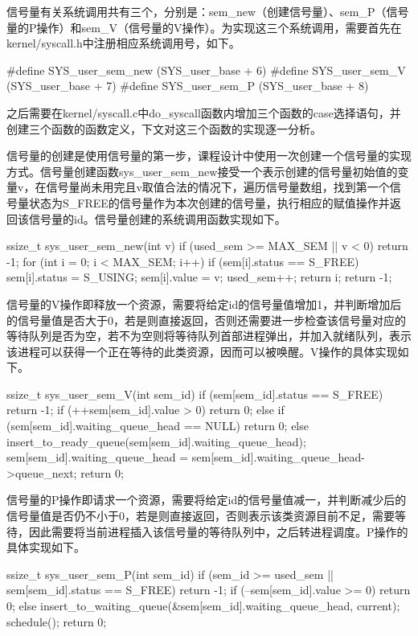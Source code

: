信号量有关系统调用共有三个，分别是：sem_new（创建信号量）、sem_P（信号量的P操作）和sem_V（信号量的V操作）。为实现这三个系统调用，需要首先在kernel/syscall.h中注册相应系统调用号，如下。
\begin{cppcode}
#define SYS_user_sem_new (SYS_user_base + 6)
#define SYS_user_sem_V (SYS_user_base + 7)
#define SYS_user_sem_P (SYS_user_base + 8)
\end{cppcode}
之后需要在kernel/syscall.c中do_syscall函数内增加三个函数的case选择语句，并创建三个函数的函数定义，下文对这三个函数的实现逐一分析。

信号量的创建是使用信号量的第一步，课程设计中使用一次创建一个信号量的实现方式。信号量创建函数sys_user_sem_new接受一个表示创建的信号量初始值的变量v，在信号量尚未用完且v取值合法的情况下，遍历信号量数组，找到第一个信号量状态为S_FREE的信号量作为本次创建的信号量，执行相应的赋值操作并返回该信号量的id。信号量创建的系统调用函数实现如下。
\begin{cppcode}
ssize_t sys_user_sem_new(int v) {
    if (used_sem >= MAX_SEM || v < 0) return -1;
    for (int i = 0; i < MAX_SEM; i++) {
        if (sem[i].status == S_FREE) {
            sem[i].status = S_USING;
            sem[i].value = v;
            used_sem++;
            return i;
        }
    }
    return -1;
}
\end{cppcode}

信号量的V操作即释放一个资源，需要将给定id的信号量值增加1，并判断增加后的信号量值是否大于0，若是则直接返回，否则还需要进一步检查该信号量对应的等待队列是否为空，若不为空则将等待队列首部进程弹出，并加入就绪队列，表示该进程可以获得一个正在等待的此类资源，因而可以被唤醒。V操作的具体实现如下。
\begin{cppcode}
ssize_t sys_user_sem_V(int sem_id) {
    if (sem[sem_id].status == S_FREE) return -1;
    if (++sem[sem_id].value > 0) return 0;
    else if (sem[sem_id].waiting_queue_head == NULL) return 0;
    else {
        insert_to_ready_queue(sem[sem_id].waiting_queue_head);
        sem[sem_id].waiting_queue_head = sem[sem_id].waiting_queue_head->queue_next;
    }
    return 0;
}
\end{cppcode}

信号量的P操作即请求一个资源，需要将给定id的信号量值减一，并判断减少后的信号量值是否仍不小于0，若是则直接返回，否则表示该类资源目前不足，需要等待，因此需要将当前进程插入该信号量的等待队列中，之后转进程调度。P操作的具体实现如下。
\begin{cppcode}
ssize_t sys_user_sem_P(int sem_id) {
    if (sem_id >= used_sem || sem[sem_id].status == S_FREE) return -1;
    if (--sem[sem_id].value >= 0) return 0;
    else {
        insert_to_waiting_queue(&sem[sem_id].waiting_queue_head, current);
        schedule();
    }
    return 0;
}
\end{cppcode}

